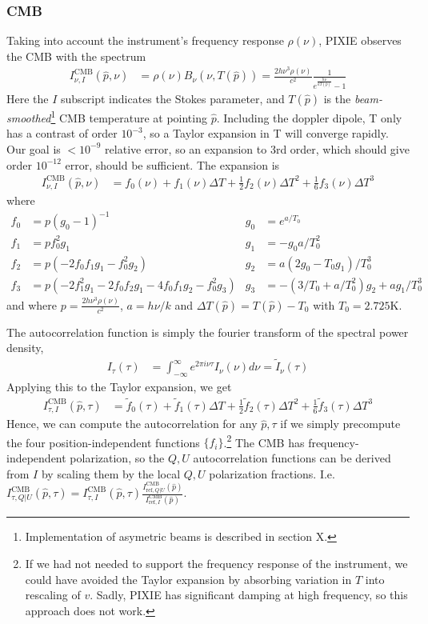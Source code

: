 \documentclass{article}
\begin{document}
\subsubsection{CMB}
Taking into account the instrument's frequency response $\rho(\nu)$, PIXIE
observes the CMB with the spectrum
\begin{align}
I^\textrm{CMB}_{\nu,I}(\hat p, \nu) &= \rho(\nu)B_\nu(\nu, T(\hat p)) = \frac{2h\nu^3\rho(\nu)}{c^2}\frac{1}{e^{\frac{h\nu}{kT(\hat p)}} - 1}
\end{align}
Here the $I$ subscript indicates the Stokes parameter, and $T(\hat p)$ is the
\emph{beam-smoothed}\footnote{Implementation of asymetric beams is described in
section X.} CMB temperature at pointing $\hat p$.
Including the doppler dipole, T only has a contrast of order $10^{-3}$, so a Taylor
expansion in T will converge rapidly. Our goal is $<10^{-9}$ relative error, so an
expansion to 3rd order, which should give order $10^{-12}$ error, should be sufficient.
The expansion is
\begin{align}
	I^\textrm{CMB}_{\nu,I}(\hat p, \nu) &= f_0(\nu) + f_1(\nu) \Delta T + \frac12 f_2(\nu) \Delta T^2 + \frac16 f_3(\nu) \Delta T^3
\end{align}
where
\begin{align*}
	f_0 &= p(g_0-1)^{-1}    & g_0 &= e^{a/T_0} \\
	f_1 &= pf_0^2 g_1       & g_1 &= -g_0 a/T_0^2 \\
	f_2 &= p(-2 f_0 f_1 g_1 - f_0^2 g_2) &
	g_2 &= a(2 g_0-T_0 g_1)/T_0^3 \\
	f_3 &= p(-2 f_1^2 g_1 - 2f_0 f_2 g_1 - 4 f_0 f_1 g_2 - f_0^2 g_3) &
	g_3 &= -(3/T_0 + a/T_0^2)g_2 + a g_1/T_0^3
\end{align*}
and where $p = \frac{2h\nu^3\rho(\nu)}{c^2}$, $a = h\nu/k$ and $\Delta T(\hat p) = T(\hat p)-T_0$ with $T_0 = 2.725$K. 

The autocorrelation function is simply the fourier transform of the spectral power
density,
\begin{align}
I_\tau(\tau) &= \int_{-\infty}^\infty e^{2\pi i \nu \tau} I_\nu(\nu) d\nu = \tilde I_\nu(\tau)
\end{align}
Applying this to the Taylor expansion, we get
\begin{align}
I^\textrm{CMB}_{\tau,I}(\hat p,\tau) &= \tilde f_0(\tau) + \tilde f_1(\tau) \Delta T + \frac12 \tilde f_2(\tau) \Delta T^2 + \frac16 \tilde f_3(\tau) \Delta T^3
\end{align}
Hence, we can compute the autocorrelation for any $\hat p,\tau$ if we simply precompute
the four position-independent functions $\{f_i\}$.\footnote{
If we had not needed to support the frequency response of the instrument,
we could have avoided the Taylor expansion by absorbing variation in $T$
into rescaling of $v$. Sadly, PIXIE has significant damping at high frequency,
so this approach does not work.} The CMB has frequency-independent polarization,
so the $Q,U$ autocorrelation functions can be derived from $I$ by scaling them by
the local $Q,U$ polarization fractions. I.e. $I^\textrm{CMB}_{\tau,Q|U}(\hat p,\tau) = I^\textrm{CMB}_{\tau,I}(\hat p,\tau) \frac{I^\textrm{CMB}_{\textrm{ref},Q|U}(\hat p)}{I^\textrm{CMB}_{\textrm{ref},I}(\hat p)}$.
\end{document}
